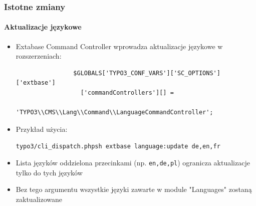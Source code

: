 
\begin{frame}[fragile]
	\frametitle{Istotne zmiany}
	\framesubtitle{Aktualizacje językowe}

	\begin{itemize}
		\item Extabase Command Controller wprowadza aktualizacje językowe
		w rozszerzeniach:

			\begin{lstlisting}
				$GLOBALS['TYPO3_CONF_VARS']['SC_OPTIONS']['extbase']
				  ['commandControllers'][] =
				  'TYPO3\\CMS\\Lang\\Command\\LanguageCommandController';
			\end{lstlisting}

		\item Przykład użycia:

			\lstinline!typo3/cli_dispatch.phpsh extbase language:update de,en,fr!

		\item Lista języków oddzielona przecinkami (np. \texttt{en,de,pl}) ogranicza aktualizacje tylko do tych języków
		\item Bez tego argumentu wszystkie języki zawarte w module "Languages" zostaną zaktualizowane

	\end{itemize}

\end{frame}


